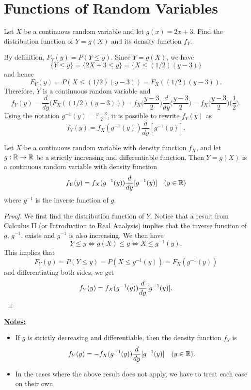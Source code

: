 \section{Functions of Random Variables}

\begin{example}
Let $X$ be a continuous random variable and let $g (x) = 2x + 3$. Find the distribution function of $Y = g(X)$ and its density function $f_Y$.
\end{example}

\begin{sol*}
By definition, $F_Y (y) = P (Y \leq y )$. Since $Y = g(X)$, we have
    \[
        \{ Y \leq y \} = \{ 2X + 3 \leq y \} = \{ X \leq (1/2) (y - 3) \}
    \]
and hence
    \[
        F_Y (y) = P (X \leq (1/2) (y - 3) ) = F_X ( (1/2) (y - 3) ) .
    \]
Therefore, $Y$ is a continuous random variable and
    \[
        f_Y (y) = \frac{d}{dy} \Big( F_X ( (1/2) (y - 3) ) \Big) = f_X \Big( \frac{y - 3}{2} \Big) \frac{d}{dy} \Big( \frac{y - 3}{2} \Big) = f_X \Big( \frac{y - 3}{2} \Big) \Big( \frac{1}{2} \Big) .
    \]
Using the notation $g^{-1} (y) = \frac{y - 3}{2}$, it is possible to rewrite $f_Y (y)$ as
    \[
        f_Y (y) = f_X (g^{-1} (y)) \frac{d}{dy} [g^{-1} (y)] . \tag*{$\triangle$}
    \]
\end{sol*}

\begin{theorem}
Let $X$ be a continuous random variable with density function $f_X$, and let $g : \mathbb{R} \rightarrow \mathbb{R}$ be a strictly increasing and differentiable function. Then $Y = g(X)$ is a continuous random variable with density function
    \[
        f_Y (y) = f_X (g^{-1} (y)) \frac{d}{dy} [g^{-1} (y) ] \quad (y \in \mathbb{R} )
    \]
where $g^{-1}$ is the inverse function of $g$.
\end{theorem}
\begin{proof}
We first find the distribution function of $Y$. Notice that a result from Calculus II (or Introduction to Real Analysis) implies that the inverse function of $g$, $g^{-1}$, exists and $g^{-1}$ is also increasing. We then have
    \[
         Y \leq y \iff g (X) \leq y \iff X \leq g^{-1} (y) .
     \] 
This implies that
    \[
        F_Y (y) = P (Y \leq y) = P (X \leq g^{-1} (y)) = F_X (g^{-1} (y))
    \]
and differentiating both sides, we get
    \[
        f_Y (y) = f_X (g^{-1} (y)) \frac{d}{dy} [g^{-1} (y)] . \qedhere
    \]
\end{proof}

\underline{\textbf{Notes:}} 
    \begin{itemize}
    \item If $g$ is strictly decreasing and differentiable, then the density function $f_Y$ is
        \[
            f_Y (y) = -f_X (g^{-1} (y)) \frac{d}{dy} [g^{-1} (y) ] \quad (y \in \mathbb{R} ) .
        \]
    \item In the cases where the above result does not apply, we have to treat each case on their own.
    \end{itemize}

